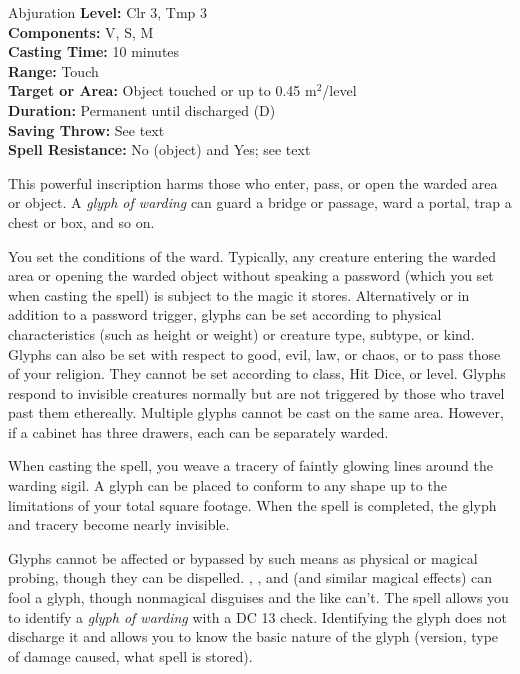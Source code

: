 {Abjuration}
{
	\textbf{Level:}
	Clr 3, Tmp 3\\
	\textbf{Components:}
	V, S, M\\
	\textbf{Casting Time:}
	10 minutes\\
	\textbf{Range:}
	Touch\\
	\textbf{Target or Area:}
	Object touched or up to 0.45 m$^2$/level\\
	\textbf{Duration:}
	Permanent until discharged (D)\\
	\textbf{Saving Throw:}
	See text\\
	\textbf{Spell Resistance:}
	No (object) and Yes; see text\\
}
{
	This powerful inscription harms those who enter, pass, or open the warded area or object. A \emph{glyph of warding} can guard a bridge or passage, ward a portal, trap a chest or box, and so on.

	You set the conditions of the ward. Typically, any creature entering the warded area or opening the warded object without speaking a password (which you set when casting the spell) is subject to the magic it stores. Alternatively or in addition to a password trigger, glyphs can be set according to physical characteristics (such as height or weight) or creature type, subtype, or kind. Glyphs can also be set with respect to good, evil, law, or chaos, or to pass those of your religion. They cannot be set according to class, Hit Dice, or level. Glyphs respond to invisible creatures normally but are not triggered by those who travel past them ethereally. Multiple glyphs cannot be cast on the same area. However, if a cabinet has three drawers, each can be separately warded.

	When casting the spell, you weave a tracery of faintly glowing lines around the warding sigil. A glyph can be placed to conform to any shape up to the limitations of your total square footage. When the spell is completed, the glyph and tracery become nearly invisible.

	Glyphs cannot be affected or bypassed by such means as physical or magical probing, though they can be dispelled. , , and  (and similar magical effects) can fool a glyph, though nonmagical disguises and the like can't. The  spell allows you to identify a \emph{glyph of warding} with a DC 13  check. Identifying the glyph does not discharge it and allows you to know the basic nature of the glyph (version, type of damage caused, what spell is stored).

}
